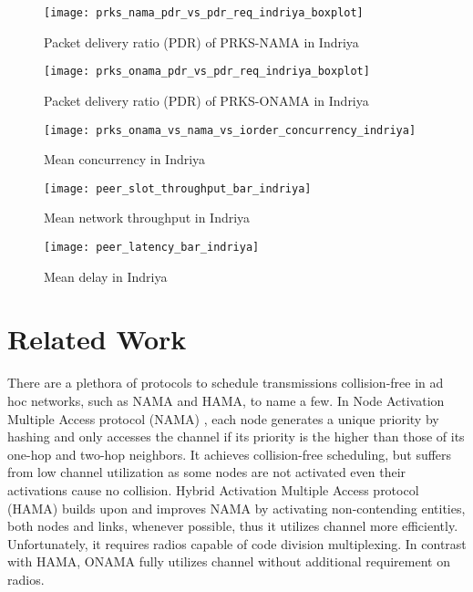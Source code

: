 \documentclass[conference]{IEEEtran}
\newcommand{\figWidth}{0.9\linewidth}	\newcommand{\figWidthM}{.99\linewidth}
\begin{document}
\begin{figure}[!tbhp]
\centering
\texttt{[image: prks\_nama\_pdr\_vs\_pdr\_req\_indriya\_boxplot]}
\caption{Packet delivery ratio (PDR) of PRKS-NAMA in Indriya}
\label{fig:prks_nama_pdr_vs_pdr_req_indriya_boxplot}
\end{figure}

\begin{figure}[!tbhp]
\centering
\texttt{[image: prks\_onama\_pdr\_vs\_pdr\_req\_indriya\_boxplot]}
\caption{Packet delivery ratio (PDR) of PRKS-ONAMA in Indriya}
\label{fig:prks_onama_pdr_vs_pdr_req_indriya_boxplot}
\end{figure}


\begin{figure}[!tbhp]
\centering
\texttt{[image: prks\_onama\_vs\_nama\_vs\_iorder\_concurrency\_indriya]}
\caption{Mean concurrency in Indriya}
\label{fig:prks_onama_vs_nama_vs_iorder_concurrency_indriya}
\end{figure}

\begin{figure}[!tbhp]
\centering
\texttt{[image: peer\_slot\_throughput\_bar\_indriya]}
\caption{Mean network throughput in Indriya}
\label{fig:peer_slot_throughput_bar_indriya}
\end{figure}

\begin{figure}[!tbhp]
\centering
\texttt{[image: peer\_latency\_bar\_indriya]}
\caption{Mean delay in Indriya}
\label{fig:peer_latency_bar_indriya}
\end{figure}
 \section{Related Work}	\label{section:relatedwork}
There are a plethora of protocols to schedule transmissions collision-free in ad hoc networks, such as NAMA and HAMA, to name a few. In Node Activation Multiple Access protocol (NAMA) \cite{nama:bao:mobicom01}, each node generates a unique priority by hashing and only accesses the channel if its priority is the higher than those of its one-hop and two-hop neighbors. It achieves collision-free scheduling, but suffers from low channel utilization as some nodes are not activated even their activations cause no collision. Hybrid Activation Multiple Access protocol (HAMA) \cite{hama:bao:icnp02} builds upon and improves NAMA by activating non-contending entities, both nodes and links, whenever possible, thus it utilizes channel more efficiently. Unfortunately, it requires radios capable of code division multiplexing. In contrast with HAMA, ONAMA fully utilizes channel without additional requirement on radios.
\end{document}
